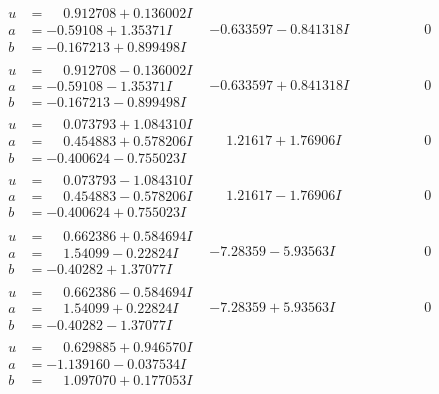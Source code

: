 \documentclass[1p]{elsarticle_modified}
\theoremstyle{definition}
\begin{document}
$$\begin{array}{c|c|c}
\begin{aligned}
u &= \phantom{-}0.912708 + 0.136002 I \\
a &= -0.59108 + 1.35371 I \\
b &= -0.167213 + 0.899498 I\end{aligned}
 & -0.633597 - 0.841318 I & \phantom{-0.000000 } 0 \\ \hline\begin{aligned}
u &= \phantom{-}0.912708 - 0.136002 I \\
a &= -0.59108 - 1.35371 I \\
b &= -0.167213 - 0.899498 I\end{aligned}
 & -0.633597 + 0.841318 I & \phantom{-0.000000 } 0 \\ \hline\begin{aligned}
u &= \phantom{-}0.073793 + 1.084310 I \\
a &= \phantom{-}0.454883 + 0.578206 I \\
b &= -0.400624 - 0.755023 I\end{aligned}
 & \phantom{-}1.21617 + 1.76906 I & \phantom{-0.000000 } 0 \\ \hline\begin{aligned}
u &= \phantom{-}0.073793 - 1.084310 I \\
a &= \phantom{-}0.454883 - 0.578206 I \\
b &= -0.400624 + 0.755023 I\end{aligned}
 & \phantom{-}1.21617 - 1.76906 I & \phantom{-0.000000 } 0 \\ \hline\begin{aligned}
u &= \phantom{-}0.662386 + 0.584694 I \\
a &= \phantom{-}1.54099 - 0.22824 I \\
b &= -0.40282 + 1.37077 I\end{aligned}
 & -7.28359 - 5.93563 I & \phantom{-0.000000 } 0 \\ \hline\begin{aligned}
u &= \phantom{-}0.662386 - 0.584694 I \\
a &= \phantom{-}1.54099 + 0.22824 I \\
b &= -0.40282 - 1.37077 I\end{aligned}
 & -7.28359 + 5.93563 I & \phantom{-0.000000 } 0 \\ \hline\begin{aligned}
u &= \phantom{-}0.629885 + 0.946570 I \\
a &= -1.139160 - 0.037534 I \\
b &= \phantom{-}1.097070 + 0.177053 I\end{aligned}

\end{array}$$
\end{document}
